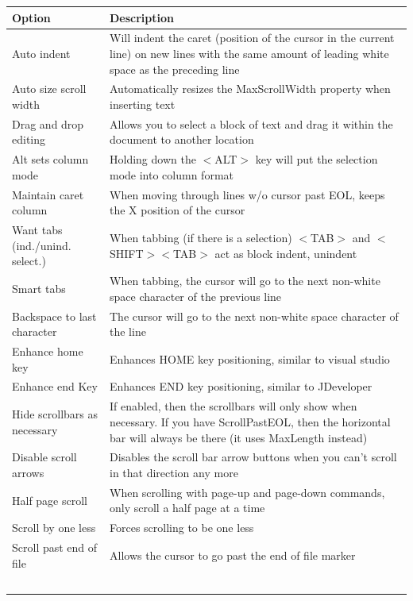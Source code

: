 \begin{table}
  \begin{footnotesize}
    \begin{tabularx}{\headwidth}{lX}\\
      \hline
      \textbf{Option} & \textbf{Description} \\
      \hline %
      Auto indent & Will indent the caret (position of the cursor in the current line) on new lines with the same amount of leading white space as the preceding line \\
      Auto size scroll width & Automatically resizes the MaxScrollWidth property when inserting text \\
      Drag and drop editing & Allows you to select a block of text and drag it within the document to another location \\
      Alt sets column mode & Holding down the $<$ALT$>$ key will put the selection mode into column format \\
      Maintain caret column & When moving through lines w/o cursor past EOL, keeps the X position of the cursor \\
      Want tabs (ind./unind. select.) & When tabbing (if there is a selection) $<$TAB$>$ and $<$SHIFT$>$$<$TAB$>$ act as block indent, unindent \\
      Smart tabs & When tabbing, the cursor will go to the next non-white space character of the previous line \\
      Backspace to last character & The cursor will go to the next non-white space character of the line \\
      Enhance home key & Enhances HOME key positioning, similar to visual studio \\
      Enhance end Key & Enhances END key positioning, similar to JDeveloper \\
      Hide scrollbars as necessary & If enabled, then the scrollbars will only show when necessary.
      If you have ScrollPastEOL, then the horizontal bar will always be there (it uses MaxLength instead) \\
      Disable scroll arrows & Disables the scroll bar arrow buttons when you can't scroll in that direction any more \\
      Half page scroll & When scrolling with page-up and page-down commands, only scroll a half page at a time \\
      Scroll by one less & Forces scrolling to be one less \\
      Scroll past end of file & Allows the cursor to go past the end of file marker \\
$$
\end{tabularx}
\end{footnotesize}
\end{table}
